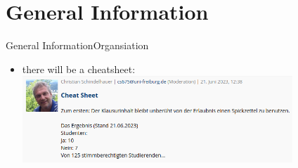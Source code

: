 
\section{General Information}

\begin{frame}{General Information}{Organsiation}
  \begin{itemize}
    \item there will be a \alert{cheatsheet}:
      \includegraphics[width=0.8\textwidth]{./figures/forum.png}
  \end{itemize}
\end{frame}
